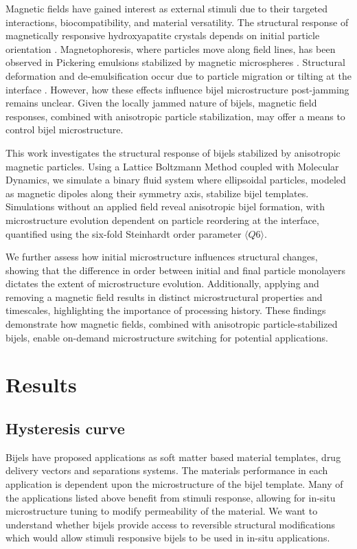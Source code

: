 Magnetic fields have gained interest as external stimuli due to their targeted interactions, biocompatibility, and material 
versatility. The structural response of magnetically responsive hydroxyapatite crystals depends on initial particle orientation
\cite{nakayama_stimuli-responsive_2018}. Magnetophoresis, where particles move along field lines, has been observed in Pickering 
emulsions stabilized by magnetic microspheres \cite{tham_magnetophoresis_2021}. Structural deformation and de-emulsification occur due 
to particle migration or tilting at the interface \cite{yang_rapid_2020, misra_magnetic_2020}. However, how these effects influence 
bijel microstructure post-jamming remains unclear. Given the locally jammed nature of bijels, magnetic field responses, combined with 
anisotropic particle stabilization, may offer a means to control bijel microstructure.

This work investigates the structural response of bijels stabilized by anisotropic magnetic particles. Using a Lattice Boltzmann Method 
coupled with Molecular Dynamics, we simulate a binary fluid system where ellipsoidal particles, modeled as magnetic dipoles along their 
symmetry axis, stabilize bijel templates. Simulations without an applied field reveal anisotropic bijel formation, with microstructure 
evolution dependent on particle reordering at the interface, quantified using the six-fold Steinhardt order parameter \(\langle Q6 \rangle\).

We further assess how initial microstructure influences structural changes, showing that the difference in order between initial and final 
particle monolayers dictates the extent of microstructure evolution. Additionally, applying and removing a magnetic field results in distinct 
microstructural properties and timescales, highlighting the importance of processing history. These findings demonstrate how magnetic fields, 
combined with anisotropic particle-stabilized bijels, enable on-demand microstructure switching for potential applications.

\section{Results}\label{sec:results_p2}
\subsection{Hysteresis curve}\label{section:hysteresis_curve}

Bijels have proposed applications as soft matter based material templates, drug delivery vectors and separations systems. The materials 
performance in each application is dependent upon the microstructure of the bijel template. Many of the applications listed above benefit 
from stimuli response, allowing for in-situ microstructure tuning to modify permeability of the material. We want to understand whether 
bijels provide access to reversible structural modifications which would allow stimuli responsive bijels to be used in in-situ applications.

